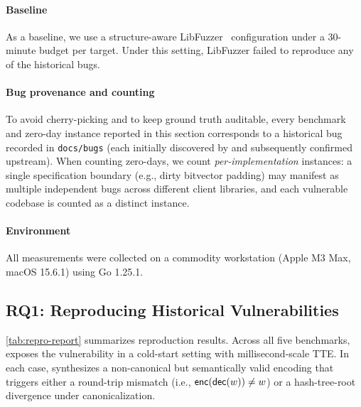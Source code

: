 \paragraph{Baseline}
As a baseline, we use a structure-aware LibFuzzer~\cite{libfuzzer} configuration under a 30-minute budget per target.
Under this setting, LibFuzzer failed to reproduce any of the historical bugs.

\paragraph{Bug provenance and counting}
To avoid cherry-picking and to keep ground truth auditable, every benchmark and zero-day instance reported in this section corresponds to a historical bug recorded in \texttt{docs/bugs} (each initially discovered by \tool and subsequently confirmed upstream).
When counting zero-days, we count \emph{per-implementation} instances: a single specification boundary (e.g., dirty bitvector padding) may manifest as multiple independent bugs across different client libraries, and each vulnerable codebase is counted as a distinct instance.

\paragraph{Environment}
All measurements were collected on a commodity workstation (Apple M3 Max, macOS 15.6.1) using Go 1.25.1.

\subsection{RQ1: Reproducing Historical Vulnerabilities}

\autoref{tab:repro-report} summarizes reproduction results.
Across all five benchmarks, \tool exposes the vulnerability in a cold-start setting with millisecond-scale TTE.
In each case, \tool synthesizes a non-canonical but semantically valid encoding that triggers either a round-trip mismatch (i.e., \({\sf enc}({\sf dec}(w)) \neq w\)) or a hash-tree-root divergence under canonicalization.

